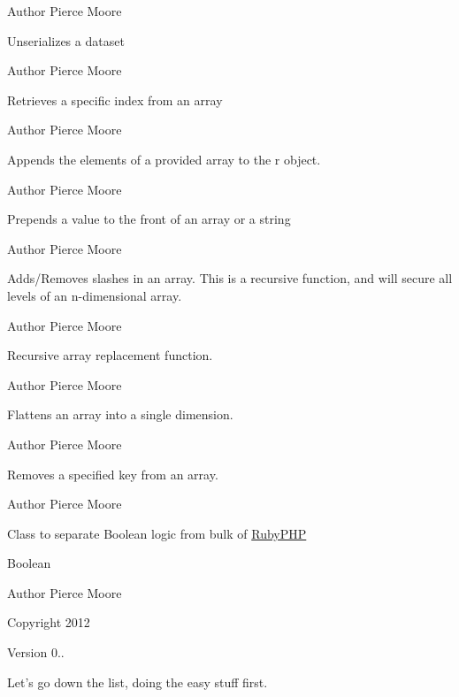 \begin{DoxyAuthor}{Author}
Pierce Moore
\end{DoxyAuthor}
Unserializes a dataset

\begin{DoxyAuthor}{Author}
Pierce Moore
\end{DoxyAuthor}
Retrieves a specific index from an array

\begin{DoxyAuthor}{Author}
Pierce Moore
\end{DoxyAuthor}
Appends the elements of a provided array to the r object.

\begin{DoxyAuthor}{Author}
Pierce Moore
\end{DoxyAuthor}
Prepends a value to the front of an array or a string

\begin{DoxyAuthor}{Author}
Pierce Moore
\end{DoxyAuthor}
Adds/\-Removes slashes in an array. This is a recursive function, and will secure all levels of an n-\/dimensional array.

\begin{DoxyAuthor}{Author}
Pierce Moore
\end{DoxyAuthor}
Recursive array replacement function.

\begin{DoxyAuthor}{Author}
Pierce Moore
\end{DoxyAuthor}
Flattens an array into a single dimension.

\begin{DoxyAuthor}{Author}
Pierce Moore
\end{DoxyAuthor}
Removes a specified key from an array.

\begin{DoxyAuthor}{Author}
Pierce Moore
\end{DoxyAuthor}
Class to separate Boolean logic from bulk of \hyperlink{namespace_ruby_p_h_p}{Ruby\-P\-H\-P}

Boolean \begin{DoxyAuthor}{Author}
Pierce Moore 
\end{DoxyAuthor}
\begin{DoxyCopyright}{Copyright}
2012 
\end{DoxyCopyright}
\begin{DoxyVersion}{Version}
0..
\end{DoxyVersion}
Let's go down the list, doing the easy stuff first.

